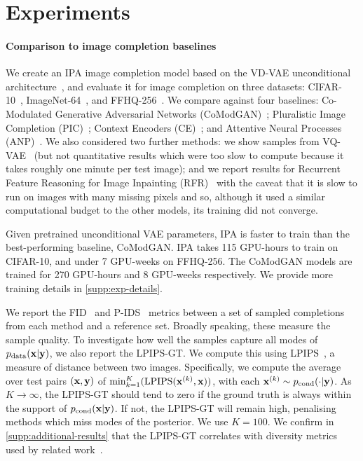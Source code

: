 \section{Experiments} \label{sec:cigcvae-experiments}

\paragraph{Comparison to image completion baselines}

We create an IPA image completion model based on the VD-VAE unconditional
architecture~\citep{child2020very}, and evaluate it for image completion on
three datasets: CIFAR-10~\citep{krizhevsky2009learning},
ImageNet-64~\citep{deng2009imagenet}, and FFHQ-256~\citep{karras2019style}. We
compare against four baselines: Co-Modulated Generative Adversarial Networks
(CoModGAN)~\citep{zhao2021large}; Pluralistic Image Completion
(PIC)~\citep{zheng2019pluralistic}; Context Encoders
(CE)~\citep{pathak2016context}; and Attentive Neural Processes
(ANP)~\citep{kim2019attentive}. We also considered two further methods: we show
samples from VQ-VAE~\citep{peng2021generating} (but not quantitative results
which were too slow to compute because it takes roughly one minute per test
image); and we report results for Recurrent Feature Reasoning for Image
Inpainting (RFR)~\citep{li2020recurrent} with the caveat that it is slow to run
on images with many missing pixels and so, although it used a similar
computational budget to the other models, its training did not converge.

Given pretrained unconditional VAE parameters, IPA is faster to train than the
best-performing baseline, CoModGAN. IPA takes 115 GPU-hours to train on
CIFAR-10, and under 7 GPU-weeks on FFHQ-256. The CoModGAN models are trained for
270 GPU-hours and 8 GPU-weeks respectively. We provide more training details in
\cref{supp:exp-details}.

We report the FID~\citep{heusel2017gans} and P-IDS~\citep{zhao2021large} metrics
between a set of sampled completions from each method and a reference set.
Broadly speaking, these measure the sample quality.
%
To investigate how well the samples capture all modes of
$p_{\rm{data}}{}(\mathbf{x}{}|\mathbf{y}{})$, we also report the LPIPS-GT. We compute this using
LPIPS~\citep{zhang2018unreasonable}, a measure of distance between two images.
Specifically, we compute the average over test pairs $(\mathbf{x}{}, \mathbf{y}{})$ of
$\min_{k=1}^K(\text{LPIPS}(\mathbf{x}{}^{(k)} , \mathbf{x}))$, with each $\mathbf{x}{}^{(k)} \sim
p_{\text{cond}}{}(\cdot | \mathbf{y})$. As $K \rightarrow \infty$, the LPIPS-GT should tend
to zero if the ground truth is always within the support of
$p_{\text{cond}}(\mathbf{x}{}|\mathbf{y}{})$. If not, the LPIPS-GT will remain high, penalising
methods which miss modes of the posterior. We use $K=100$. We confirm in
\cref{supp:additional-results} that the LPIPS-GT correlates with diversity
metrics used by related work~\citep{zhu2017toward,li2020multimodal}.


